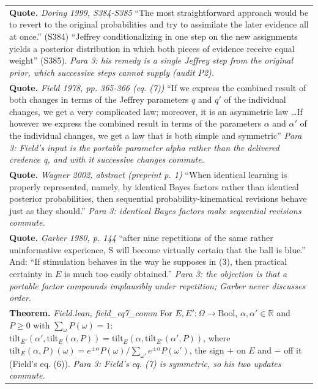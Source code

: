 \documentclass[10pt]{article}
\theoremstyle{definition}
\newlength{\fullw}\setlength{\fullw}{25.9cm}
\begin{document}
{\begin{longtable}{|p{0.9cm}|p{12.2cm}|p{12.2cm}|}
\multicolumn{3}{|p{\fullw}|}{\textbf{Quote.} \textit{Doring 1999, S384-S385} \newline ``The most straightforward approach would be to revert to the original probabilities and try to assimilate the later evidence all at once.'' (S384) ``Jeffrey conditionalizing in one step on the new assignments yields a posterior distribution in which both pieces of evidence receive equal weight'' (S385). \newline \textit{Para 3: his remedy is a single Jeffrey step from the original prior, which successive steps cannot supply (audit P2).}} \\
\multicolumn{3}{|p{\fullw}|}{\textbf{Quote.} \textit{Field 1978, pp. 365-366 (eq. (7))} \newline ``If we express the combined result of both changes in terms of the Jeffrey parameters $q$ and $q'$ of the individual changes, we get a very complicated law; moreover, it is an asymmetric law \ldots If however we express the combined result in terms of the parameters $\alpha$ and $\alpha'$ of the individual changes, we get a law that is both simple and symmetric'' \newline \textit{Para 3: Field's input is the portable parameter alpha rather than the delivered credence q, and with it successive changes commute.}} \\
\multicolumn{3}{|p{\fullw}|}{\textbf{Quote.} \textit{Wagner 2002, abstract (preprint p. 1)} \newline ``When identical learning is properly represented, namely, by identical Bayes factors rather than identical posterior probabilities, then sequential probability-kinematical revisions behave just as they should.'' \newline \textit{Para 3: identical Bayes factors make sequential revisions commute.}} \\
\multicolumn{3}{|p{\fullw}|}{\textbf{Quote.} \textit{Garber 1980, p. 144} \newline ``after nine repetitions of the same rather uninformative experience, S will become virtually certain that the ball is blue.'' And: ``If stimulation behaves in the way he supposes in (3), then practical certainty in $E$ is much too easily obtained.'' \newline \textit{Para 3: the objection is that a portable factor compounds implausibly under repetition; Garber never discusses order.}} \\
\multicolumn{3}{|p{\fullw}|}{\textbf{Theorem.} \textit{Field.lean, field\_eq7\_comm} \newline For $E, E' : \Omega \to \mathrm{Bool}$, $\alpha, \alpha' \in \mathbb{R}$ and $P \geq 0$ with $\sum_\omega P(\omega) = 1$: $\mathrm{tilt}_{E'}(\alpha', \mathrm{tilt}_E(\alpha, P)) = \mathrm{tilt}_E(\alpha, \mathrm{tilt}_{E'}(\alpha', P))$, where $\mathrm{tilt}_E(\alpha,P)(\omega) = e^{\pm\alpha}P(\omega)\big/\sum_{\omega'} e^{\pm\alpha}P(\omega')$, the sign $+$ on $E$ and $-$ off it (Field's eq. (6)). \newline \textit{Para 3: Field's eq. (7) is symmetric, so his two updates commute.}} \\

\end{longtable}}
\end{document}
